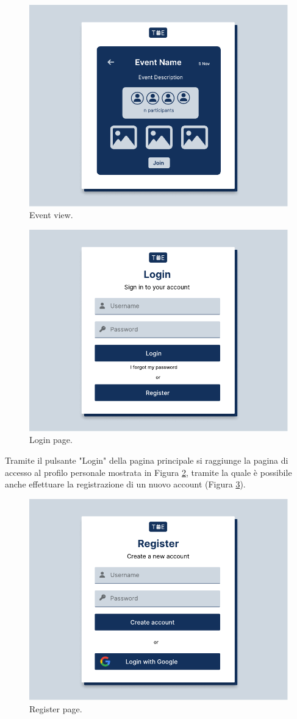 \documentclass[9pt]{extarticle}
\begin{document}
\begin{figure}[!htb]
	\centering
	\includegraphics[width=.7\linewidth]{./images/EventView.pdf}
	\caption{Event view.}
	\label{fig:eventView}
\end{figure}


\begin{figure}[!htb]
	\centering
	\includegraphics[width=.7\linewidth]{./images/Login.pdf}
	\caption{Login page.}
	\label{fig:login}
\end{figure}

Tramite il pulsante "Login" della pagina principale si raggiunge la pagina di accesso al profilo personale mostrata in Figura \ref{fig:login}, tramite la quale è possibile anche effettuare la registrazione di un nuovo account (Figura \ref{fig:register}).
\newpage

\begin{figure}[!htb]
	\centering
	\includegraphics[width=.7\linewidth]{./images/Register.pdf}
	\caption{Register page.}
	\label{fig:register}
\end{figure}
\end{document}
